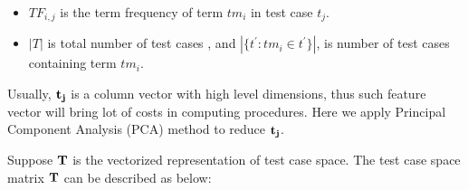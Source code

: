 \documentclass{sig-alternate}
\begin{document}
\begin{itemize}
\item $TF_{i,j}$ is the term frequency of term $tm_{i}$ in test case $t_{j}$.
\item $|T|$ is total number of test cases , and ${|\{t^{'} : tm_i \in t^{'}\}|}$, is number of test cases containing term $tm_{i}$.
\end{itemize} 

Usually, ${\bf  t_{j}}$ is a column vector with high level dimensions, thus such feature vector will bring lot of costs in computing procedures. Here we apply Principal Component Analysis (PCA) method to reduce ${\bf  t_{j}}$.

Suppose ${\bf T}$ is the vectorized representation of test case space. The test case space matrix ${\bf T}$ can be described as below:
\end{document}
